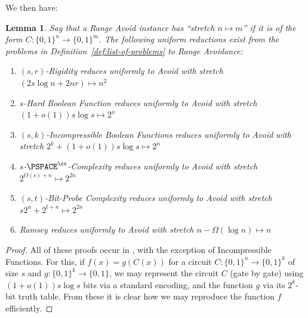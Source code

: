 \documentclass[11pt]{article}
\newtheorem{lemma}{Lemma}
\newcommand{\B}{\{0,1\}}
\begin{document}
We then have:
\begin{lemma}\label{lem:reductions}
Say that a Range Avoid instance has ``stretch $n \mapsto m$'' if it is of the form $C: \B^n \to \B^m$. The following uniform reductions exist from the problems in Definition~\ref{def:list-of-problems} to Range Avoidance:
\begin{enumerate}
    \item $(s,r)$-Rigidity reduces uniformly to Avoid with stretch $(2s \log n + 2nr) \mapsto n^2$
    \item $s$-Hard Boolean Function reduces uniformly to Avoid with stretch $(1+o(1))s\log s \mapsto 2^n$
    \item $(s,k)$-Incompressible Boolean Functions reduces uniformly to Avoid with stretch $2^k + (1+o(1))s\log s \mapsto 2^n$
    \item $s$-$\PSPACE^{\cc}$-Complexity reduces uniformly to Avoid with stretch $2^{O(s) + n} \mapsto 2^{2n}$
    \item $(s,t)$-Bit-Probe Complexity reduces uniformly to Avoid with stretch $s2^n + 2^{t + n} \mapsto 2^{2n}$
    \item Ramsey reduces uniformly to Avoid with stretch $n - \Omega(\log n) \mapsto n$
\end{enumerate}
\end{lemma}
\begin{proof}
All of these proofs occur in \cite{Korten21}, with the exception of Incompressible Functions. For this, if $f(x) = g(C(x))$ for a circuit $C: \B^n \to \B^k$ of size $s$ and $g: \B^k \to \B$, we may represent the circuit $C$ (gate by gate) using $(1+o(1))s\log s$ bits via a standard encoding, and the function $g$ via its $2^k$-bit truth table. From these it is clear how we may reproduce the function $f$ efficiently.
\end{proof}
\end{document}
